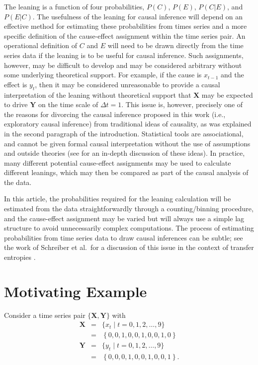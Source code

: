 \documentclass[twocolumn,aps,pre,groupedaddress]{revtex4-1}
\begin{document}
The leaning is a function of four probabilities, $P(C)$, $P(E)$, $P(C|E)$, and $P(E|C)$.  The usefulness of the leaning for causal inference will depend on an effective method for estimating these probabilities from times series and a more specific definition of the cause-effect assignment within the time series pair.  An operational definition of $C$ and $E$ will need to be drawn directly from the time series data if the leaning is to be useful for causal inference.  Such assignments, however, may be difficult to develop and may be considered arbitrary without some underlying theoretical support.  For example, if the cause is $x_{t-1}$ and the effect is $y_{t}$, then it may be considered unreasonable to provide a causal interpretation of the leaning without theoretical support that $\mathbf{X}$ may be expected to drive $\mathbf{Y}$ on the time scale of $\Delta t=1$.  This issue is, however, precisely one of the reasons for divorcing the causal inference proposed in this work (i.e., exploratory causal inference) from traditional ideas of causality, as was explained in the second paragraph of the introduction.  Statistical tools are associational, and cannot be given formal causal interpretation without the use of assumptions and outside theories (see \cite{Illari2014} for an in-depth discussion of these ideas).  In practice, many different potential cause-effect assignments may be used to calculate different leanings, which may then be compared as part of the causal analysis of the data.

In this article, the probabilities required for the leaning calculation will be estimated from the data straightforwardly through a counting/binning procedure, and the cause-effect assignment may be varied but will always use a simple lag structure to avoid unnecessarily complex computations.  The process of estimating probabilities from time series data to draw causal inferences can be subtle; see the work of Schreiber et al.\ for a discussion of this issue in the context of transfer entropies \cite{kaiser2002}.  

\section{Motivating Example}
Consider a time series pair $\{\mathbf{X},\mathbf{Y}\}$ with
\begin{eqnarray*}
\label{eq:motex}
\mathbf{X} &=& \{x_t\; | \; t=0,1,2,\ldots,9 \}\\
&=& \left\{0,0,1,0,0,1,0,0,1,0\right\}\\
\mathbf{Y} &=& \{y_t\; | \; t=0,1,2,\ldots,9\}\\
&=& \left\{0,0,0,1,0,0,1,0,0,1\right\}.
\end{eqnarray*}
\end{document}
